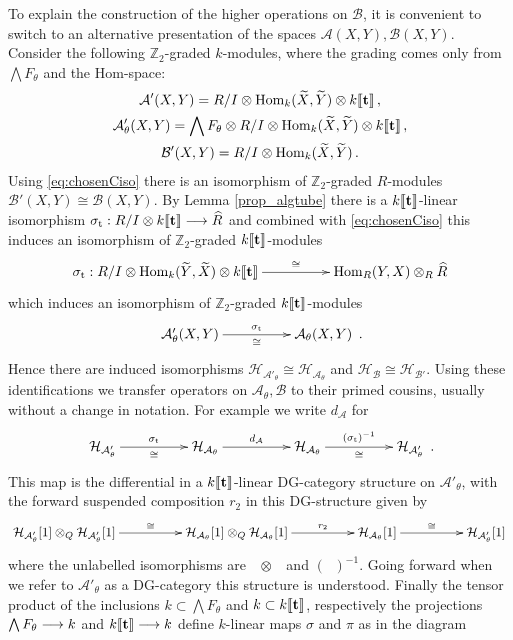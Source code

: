 \documentclass[english,letter paper,12pt,leqno]{article}
\theoremstyle{example}
\numberwithin{equation}{section}
\def\AA{\mathcal{A}}
\def\BB{\mathcal{B}}
\def\HH{\HH}
\def\HH{\mathcal{H}}
\def\Hom{\operatorname{Hom}}
\def\be{\begin{equation}}
\def\ee{\end{equation}}
\def\nZ{\mathds{Z}}
\DeclareMathOperator{\sigmastar}{\sigma_t}
\begin{document}
To explain the construction of the higher operations on $\BB$, it is convenient to switch to an alternative presentation of the spaces $\AA(X,Y), \BB(X,Y)$. Consider the following $\nZ_2$-graded $k$-modules, where the grading comes only from $\bigwedge F_\theta$ and the Hom-space:
\begin{gather*}
\AA'(X,Y) = R/I \otimes \Hom_k(\widetilde{X},\widetilde{Y}) \otimes k\llbracket \bold{t} \rrbracket\,,\\
\AA'_\theta(X,Y) = \bigwedge F_\theta \otimes R/I \otimes \Hom_k(\widetilde{X},\widetilde{Y}) \otimes k\llbracket \bold{t} \rrbracket\,, \\
\BB'(X,Y) = R/I \otimes \Hom_k(\widetilde{X},\widetilde{Y})\,.
\end{gather*}
Using \eqref{eq:chosenCiso} there is an isomorphism of $\nZ_2$-graded $R$-modules $\BB'(X,Y) \cong \BB(X,Y)$. By Lemma \ref{prop_algtube} there is a $k\llbracket \bold{t} \rrbracket$-linear isomorphism $\sigmastar: R/I \otimes k \llbracket \bold{t} \rrbracket \lto \widehat{R}$ and combined with \eqref{eq:chosenCiso} this induces an isomorphism of $\nZ_2$-graded $k\llbracket \bold{t} \rrbracket$-modules
\be\label{eq:transfer_iso_intro}
\xymatrix@C+2pc{
\sigmastar: R/I \otimes \Hom_k(\coeff{Y},\coeff{X}) \otimes k\llbracket \bold{t} \rrbracket \ar[r]^-{\cong} & 
\Hom_R(Y,X) \otimes_R \widehat{R}
}
\ee
which induces an isomorphism of $\nZ_2$-graded $k\llbracket \bold{t} \rrbracket$-modules
\[
\xymatrix@C+2pc{
\AA'_\theta(X,Y) \ar[r]_-{\cong}^{\sigmastar} & \AA_\theta(X,Y)
}\,.
\]
Hence there are induced isomorphisms $\HH_{\AA'_\theta} \cong \HH_{\AA_\theta}$ and $\HH_{\BB} \cong \HH_{\BB'}$. Using these identifications we transfer operators on $\AA_\theta,\BB$ to their primed cousins, usually without a change in notation. For example we write $d_\AA$ for
\[
\xymatrix@C+2pc{
\HH_{\AA'_\theta} \ar[r]^-{\sigmastar}_-{\cong} & \HH_{\AA_\theta} \ar[r]^-{d_{\AA}} & \HH_{\AA_\theta} \ar[r]^-{(\sigmastar)^{-1}}_-{\cong} & \HH_{\AA'_\theta}
}\,.
\]
This map is the differential in a $k\llbracket \bold{t} \rrbracket$-linear DG-category structure on $\AA'_\theta$, with the forward suspended composition $r_2$ in this DG-structure given by
\[
\xymatrix@C+2pc{
\HH_{\AA'_\theta}[1] \otimes_Q \HH_{\AA'_\theta}[1] \ar[r]^-{\cong} & \HH_{\AA_\theta}[1] \otimes_Q \HH_{\AA_\theta}[1] \ar[r]^-{r_2} & \HH_{\AA_\theta}[1] \ar[r]^-{\cong} & \HH_{\AA'_{\theta}}[1]
}
\]
where the unlabelled isomorphisms are $\sigmastar \otimes \sigmastar$ and $(\sigmastar)^{-1}$. Going forward when we refer to $\AA'_\theta$ as a DG-category this structure is understood. Finally the tensor product of the inclusions $k \subset \bigwedge F_\theta$ and $k \subset k\llbracket \bold{t} \rrbracket$, respectively the projections $\bigwedge F_\theta \longrightarrow k$ and $k \llbracket \bold{t} \rrbracket \longrightarrow k$ define $k$-linear maps $\sigma$ and $\pi$ as in the diagram
\end{document}
